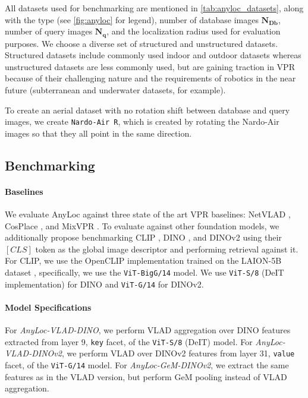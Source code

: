 All datasets used for benchmarking are mentioned in
\cref{tab:anyloc_datasets}, along with the type (see \cref{fig:anyloc}
for legend), number of database images $\mathbf{N_{Db}}$, number of
query images $\mathbf{N_q}$, and the localization radius used for
evaluation purposes. We choose a diverse set of structured and
unstructured datasets. Structured datasets include commonly used
indoor and outdoor datasets whereas unstructured datasets are less
commonly used, but are gaining traction in VPR because of their
challenging nature and the requirements of robotics in the near future
(subterranean and underwater datasets, for example).

To create an aerial dataset with no rotation shift between database 
and query images, we create \texttt{Nardo-Air R}, which is created by
rotating the Nardo-Air images so that they all point in the same 
direction.

\subsection{Benchmarking}

\paragraph{Baselines}

We evaluate AnyLoc against three state of the art VPR baselines:
NetVLAD \cite{Arandjelovi2015NetVLADCA}, CosPlace
\cite{Berton2022RethinkingVG}, and MixVPR \cite{Alibey2023MixVPRFM}.
To evaluate against other foundation models, we additionally propose
benchmarking CLIP \cite{Radford2021LearningTV}, DINO
\cite{Caron2021EmergingPI}, and DINOv2 \cite{Oquab2023DINOv2LR} using
their $\left[CLS\right]$ token as the global image descriptor and
performing retrieval against it. For CLIP, we use the OpenCLIP
implementation trained on the LAION-5B dataset
\cite{Ilharco2021OpenCLIP, Cherti2023ReproducibleSL,
Radford2021LearningTV, Schuhmann2022LAION5BAO}, specifically, we use
the \texttt{ViT-BigG/14} model. We use \texttt{ViT-S/8} (DeIT
implementation) for DINO and \texttt{ViT-G/14} for DINOv2.

\paragraph{Model Specifications}

For \emph{AnyLoc-VLAD-DINO}, we perform VLAD aggregation over DINO
features extracted from layer 9, \texttt{key} facet, of the
\texttt{ViT-S/8} (DeIT) model. For \emph{AnyLoc-VLAD-DINOv2}, we
perform VLAD over DINOv2 features from layer 31, \texttt{value} facet,
of the \texttt{ViT-G/14} model. For \emph{AnyLoc-GeM-DINOv2}, we
extract the same features as in the VLAD version, but perform GeM
pooling instead of VLAD aggregation.

